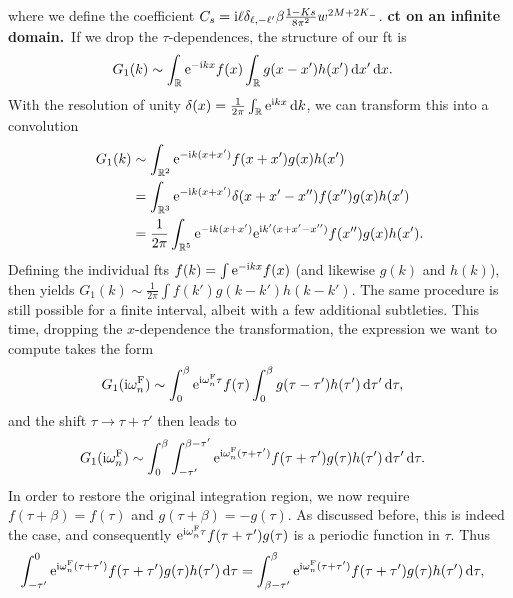 where we define the coefficient $C_s = \text{i}\ell \delta_{\ell,-\ell'} \beta \frac{1-Ks}{8\pi^2} w^{2M+2K_-}$.\newpage %
\textbf{\gls{ct} on an infinite domain.}\ If we drop the $\tau$-dependences, the structure of our \gls{ft} is
\begin{align*}
G_1(k) &\sim \int_{\mathbb{R}} \text{e}^{-\text{i} kx} f(x) \int_{\mathbb{R}} g(x-x') h(x') \, \mathrm{d}x'  \, \mathrm{d}x.
\end{align*}
With the resolution of unity $\delta(x) = \frac{1}{2\pi} \int_{\mathbb{R}} \text{e}^{\text{i} kx} \, \mathrm{d}k$, we can transform this into a convolution
\begin{align*}
G_1(k) &\sim \int_{\mathbb{R}^2} \text{e}^{-\text{i} k(x+x')} f(x+x') g(x) h(x')\\
&= \int_{\mathbb{R}^3} \text{e}^{-\text{i} k(x+x')} \delta(x+x'-x'') f(x'') g(x) h(x')\\
&= \frac{1}{2\pi} \int_{\mathbb{R}^5} \text{e}^{-\text{i} k (x+x')} \text{e}^{\text{i} k'(x+x'-x'')} f(x'') g(x) h(x').
\end{align*}
Defining the individual \glspl{ft} $f(k) = \int \text{e}^{-\text{i} kx} f(x)$ (and likewise $g(k)$ and $h(k)$), then yields $G_1(k) \sim \frac{1}{2\pi} \int f(k') g(k-k') h(k-k')$.
The same procedure is still possible for a finite interval, albeit with a few additional subtleties.
This time, dropping the $x$-dependence the transformation, the expression we want to compute takes the form
\begin{align*}
G_1(\text{i}\omega_n^{\text{F}}) &\sim \int_{0}^{\beta} \text{e}^{\text{i} \omega_n^{\text{F}}\tau} f(\tau) \int_{0}^{\beta} g(\tau-\tau') h(\tau') \,\mathrm{d}\tau'  \,\mathrm{d}\tau,
\end{align*}
and the shift $\tau\rightarrow \tau + \tau'$ then leads to
\begin{align*}
G_1(\text{i}\omega_n^{\text{F}}) &\sim \int_{0}^{\beta} \int_{-\tau'}^{\beta-\tau'} \text{e}^{\text{i} \omega_n^{\text{F}}(\tau + \tau')} f(\tau + \tau') g(\tau) h(\tau') \,\mathrm{d}\tau'  \,\mathrm{d}\tau.
\end{align*}
In order to restore the original integration region, we now require $f(\tau+\beta)=f(\tau)$ and $g(\tau+\beta) = -g(\tau)$.
As discussed before, this is indeed the case, and consequently $\text{e}^{\text{i}\omega_n^{\text{F}}\tau} f(\tau + \tau') g(\tau)$ is a periodic function in $\tau$.
Thus
\begin{align*}
\int_{-\tau'}^{0} \text{e}^{\text{i}\omega_n^{\text{F}}(\tau+\tau')} f(\tau+\tau') g(\tau) h(\tau') \,\mathrm{d}\tau &= \int_{\beta-\tau'}^{\beta} \text{e}^{\text{i}\omega_n^{\text{F}}(\tau+\tau')} f(\tau+\tau') g(\tau) h(\tau') \,\mathrm{d}\tau,
\end{align*}

